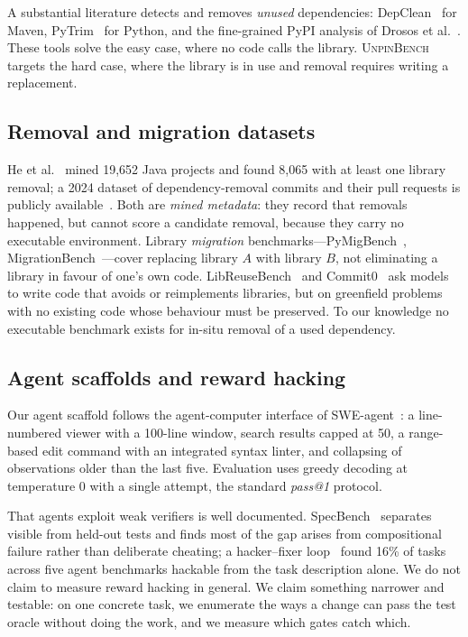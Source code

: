 \documentclass[10pt,conference]{IEEEtran}
\newcommand{\bench}{\textsc{UnpinBench}}
\begin{document}
A substantial literature detects and removes \emph{unused} dependencies:
DepClean~\cite{soto2021longitudinal} for Maven,
PyTrim~\cite{pytrim2025} for Python, and the fine-grained PyPI analysis
of Drosos et al.~\cite{drosos2024bloat}. These tools solve the easy case,
where no code calls the library. \bench{} targets the hard case, where
the library is in use and removal requires writing a replacement.

\subsection{Removal and migration datasets}

He et al.~\cite{he2021migration} mined 19,652 Java projects and found
8,065 with at least one library removal; a 2024 dataset of
dependency-removal commits and their pull requests is publicly
available~\cite{jaisri2024dataset}. Both are \emph{mined metadata}: they
record that removals happened, but cannot score a candidate removal,
because they carry no executable environment. Library \emph{migration}
benchmarks---PyMigBench~\cite{pymigbench2023},
MigrationBench~\cite{migrationbench2025}---cover replacing library $A$
with library $B$, not eliminating a library in favour of one's own code.
LibReuseBench~\cite{libreuse2026} and Commit0~\cite{commit02024} ask
models to write code that avoids or reimplements libraries, but on
greenfield problems with no existing code whose behaviour must be
preserved. To our knowledge no executable benchmark exists for in-situ
removal of a used dependency.

\subsection{Agent scaffolds and reward hacking}

Our agent scaffold follows the agent-computer interface of
SWE-agent~\cite{sweagent2024}: a line-numbered viewer with a 100-line
window, search results capped at 50, a range-based edit command with an
integrated syntax linter, and collapsing of observations older than the
last five. Evaluation uses greedy decoding at temperature 0 with a single
attempt, the standard \textit{pass@1} protocol.

That agents exploit weak verifiers is well documented.
SpecBench~\cite{specbench2026} separates visible from held-out tests and
finds most of the gap arises from compositional failure rather than
deliberate cheating; a hacker--fixer loop~\cite{hackerfixer2026} found
16\% of tasks across five agent benchmarks hackable from the task
description alone. We do not claim to measure reward hacking in general.
We claim something narrower and testable: on one concrete task, we
enumerate the ways a change can pass the test oracle without doing the
work, and we measure which gates catch which.
\end{document}
